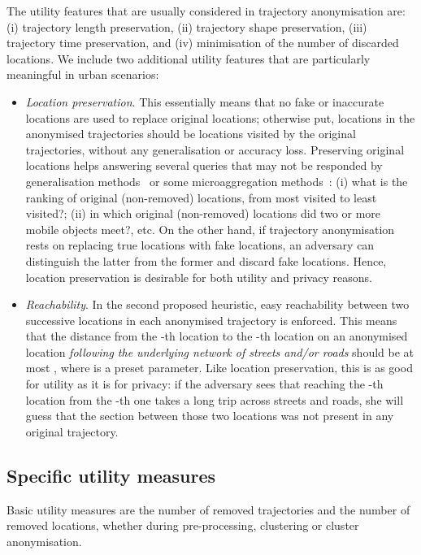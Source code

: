 The utility features that are usually considered in
trajectory anonymisation are: (i)
trajectory length preservation,
(ii) trajectory shape preservation, (iii)
trajectory time preservation, and (iv) minimisation of
the number of discarded locations. We include two additional
utility features that are particularly meaningful in urban scenarios:
\begin{itemize}
\item {\em Location preservation}.
This essentially means that no fake or inaccurate locations
are used to replace original locations; otherwise put,
locations in the anonymised trajectories should
be locations visited by the original trajectories, without
any generalisation or accuracy loss.
Preserving original locations helps answering several queries
that may not be responded by generalisation methods~\cite{monreale10}
or some microaggregation methods~\cite{abul08,abul10}:
(i) what is the ranking of original (non-removed) locations, from most visited
to least visited?; (ii) in which original (non-removed)
locations did two or more mobile
objects meet?, etc.
On the other hand, if trajectory anonymisation rests on replacing true
locations with
fake locations, an adversary can distinguish the latter from the former
and discard fake locations.
Hence, location preservation is desirable for both utility and privacy
reasons.
\item {\em Reachability}. In the second proposed heuristic,
easy reachability between two successive locations in each anonymised
trajectory is enforced. This means that
the distance from the -th location
to the -th location on an anonymised location {\em following
the underlying network of streets and/or roads}
should be at most , where  is a preset
parameter. Like location preservation, this is as good for utility
as it is for privacy: if the adversary sees that reaching the -th
location from the -th one takes a long trip across streets and roads,
she will guess that the section between those two locations was not
present in any original trajectory.
\end{itemize}

\subsection{Specific utility measures} \label{subsec:utility}


Basic utility measures are
the number of removed trajectories and the number of
removed locations, whether during pre-processing, clustering or cluster
anonymisation.

